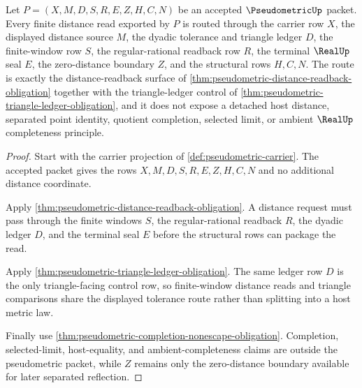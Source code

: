 \begin{theorem}
\label{thm:pseudometric-finite-window-distance-route}
Let $P=(X,M,D,S,R,E,Z,H,C,N)$ be an accepted $\PseudometricUp$ packet. Every finite distance read exported by $P$ is routed through the carrier row $X$, the displayed distance source $M$, the dyadic tolerance and triangle ledger $D$, the finite-window row $S$, the regular-rational readback row $R$, the terminal $\RealUp$ seal $E$, the zero-distance boundary $Z$, and the structural rows $H,C,N$. The route is exactly the distance-readback surface of \autoref{thm:pseudometric-distance-readback-obligation} together with the triangle-ledger control of \autoref{thm:pseudometric-triangle-ledger-obligation}, and it does not expose a detached host distance, separated point identity, quotient completion, selected limit, or ambient $\RealUp$ completeness principle.
\end{theorem}
\begin{proof}
Start with the carrier projection of \autoref{def:pseudometric-carrier}. The accepted packet gives the rows $X,M,D,S,R,E,Z,H,C,N$ and no additional distance coordinate.

Apply \autoref{thm:pseudometric-distance-readback-obligation}. A distance request must pass through the finite windows $S$, the regular-rational readback $R$, the dyadic ledger $D$, and the terminal seal $E$ before the structural rows can package the read.

Apply \autoref{thm:pseudometric-triangle-ledger-obligation}. The same ledger row $D$ is the only triangle-facing control row, so finite-window distance reads and triangle comparisons share the displayed tolerance route rather than splitting into a host metric law.

Finally use \autoref{thm:pseudometric-completion-nonescape-obligation}. Completion, selected-limit, host-equality, and ambient-completeness claims are outside the pseudometric packet, while $Z$ remains only the zero-distance boundary available for later separated reflection.
\end{proof}

